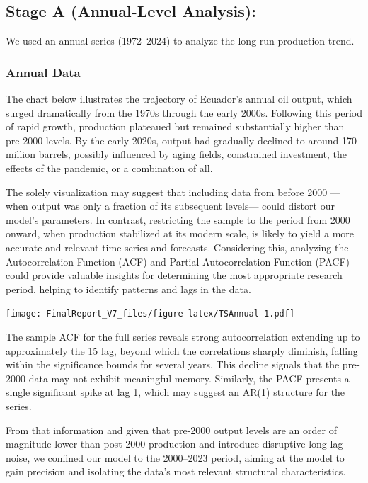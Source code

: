 \documentclass[
]{article}
\begin{document}
\subsection{Stage A (Annual-Level
Analysis):}\label{stage-a-annual-level-analysis}

We used an annual series (1972--2024) to analyze the long-run production
trend.\hspace{0pt}

\subsubsection{Annual Data}\label{annual-data}

The chart below illustrates the trajectory of Ecuador's annual oil
output, which surged dramatically from the 1970s through the early
2000s. Following this period of rapid growth, production plateaued but
remained substantially higher than pre-2000 levels. By the early 2020s,
output had gradually declined to around 170 million barrels, possibly
influenced by aging fields, constrained investment, the effects of the
pandemic, or a combination of all.

The solely visualization may suggest that including data from before
2000 ---when output was only a fraction of its subsequent levels---
could distort our model's parameters. In contrast, restricting the
sample to the period from 2000 onward, when production stabilized at its
modern scale, is likely to yield a more accurate and relevant time
series and forecasts. Considering this, analyzing the Autocorrelation
Function (ACF) and Partial Autocorrelation Function (PACF) could provide
valuable insights for determining the most appropriate research period,
helping to identify patterns and lags in the data.

\texttt{[image: FinalReport\_V7\_files/figure-latex/TSAnnual-1.pdf]}

The sample ACF for the full series reveals strong autocorrelation
extending up to approximately the 15 lag, beyond which the correlations
sharply diminish, falling within the significance bounds for several
years. This decline signals that the pre-2000 data may not exhibit
meaningful memory. Similarly, the PACF presents a single significant
spike at lag 1, which may suggest an AR(1) structure for the series.

From that information and given that pre-2000 output levels are an order
of magnitude lower than post-2000 production and introduce disruptive
long-lag noise, we confined our model to the 2000--2023 period, aiming
at the model to gain precision and isolating the data's most relevant
structural characteristics.
\end{document}
